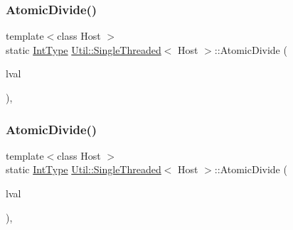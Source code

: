 \mbox{\label{classUtil_1_1SingleThreaded_afb0bc74b0e21b32b31c4895fa22a3337}} 
\subsubsection{\texorpdfstring{AtomicDivide()}{AtomicDivide()}\hspace{0.1cm}{\footnotesize\ttfamily [3/4]}}
{\footnotesize\ttfamily template$<$class Host $>$ \\
static \mbox{\hyperlink{classUtil_1_1SingleThreaded_a35932213fb0c15a7b67ced79bc2af4c6}{Int\+Type}} \mbox{\hyperlink{classUtil_1_1SingleThreaded}{Util\+::\+Single\+Threaded}}$<$ Host $>$\+::Atomic\+Divide (\begin{DoxyParamCaption}\item[{volatile \mbox{\hyperlink{classUtil_1_1SingleThreaded_a35932213fb0c15a7b67ced79bc2af4c6}{Int\+Type}} \&}]{lval }\end{DoxyParamCaption})\hspace{0.3cm}{\ttfamily [inline]}, {\ttfamily [static]}}

\mbox{\label{classUtil_1_1SingleThreaded_afb0bc74b0e21b32b31c4895fa22a3337}} 
\subsubsection{\texorpdfstring{AtomicDivide()}{AtomicDivide()}\hspace{0.1cm}{\footnotesize\ttfamily [4/4]}}
{\footnotesize\ttfamily template$<$class Host $>$ \\
static \mbox{\hyperlink{classUtil_1_1SingleThreaded_a35932213fb0c15a7b67ced79bc2af4c6}{Int\+Type}} \mbox{\hyperlink{classUtil_1_1SingleThreaded}{Util\+::\+Single\+Threaded}}$<$ Host $>$\+::Atomic\+Divide (\begin{DoxyParamCaption}\item[{volatile \mbox{\hyperlink{classUtil_1_1SingleThreaded_a35932213fb0c15a7b67ced79bc2af4c6}{Int\+Type}} \&}]{lval }\end{DoxyParamCaption})\hspace{0.3cm}{\ttfamily [inline]}, {\ttfamily [static]}}

